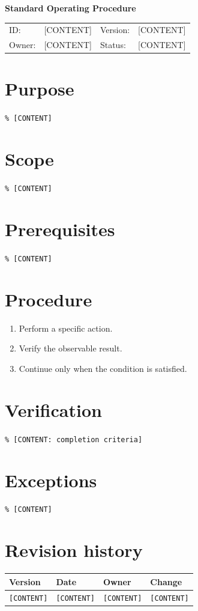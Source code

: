\documentclass[10.5pt,a4paper]{scrartcl}
\begin{document}
{\Huge\bfseries Standard Operating Procedure\par}
\begin{tabularx}{\linewidth}{@{}lXlX@{}}ID:&[CONTENT]&Version:&[CONTENT]\\Owner:&[CONTENT]&Status:&[CONTENT]\end{tabularx}
\section*{Purpose}\texttt{\% [CONTENT]}
\section*{Scope}\texttt{\% [CONTENT]}
\section*{Prerequisites}\texttt{\% [CONTENT]}
\section*{Procedure}\begin{enumerate}[leftmargin=*]\item Perform a specific action.\item Verify the observable result.\item Continue only when the condition is satisfied.\end{enumerate}
\section*{Verification}\texttt{\% [CONTENT: completion criteria]}
\section*{Exceptions}\texttt{\% [CONTENT]}
\section*{Revision history}\begin{tabularx}{\linewidth}{@{}lllX@{}}\toprule Version&Date&Owner&Change\\\midrule \texttt{[CONTENT]}&\texttt{[CONTENT]}&\texttt{[CONTENT]}&\texttt{[CONTENT]}\\\bottomrule\end{tabularx}
\end{document}
